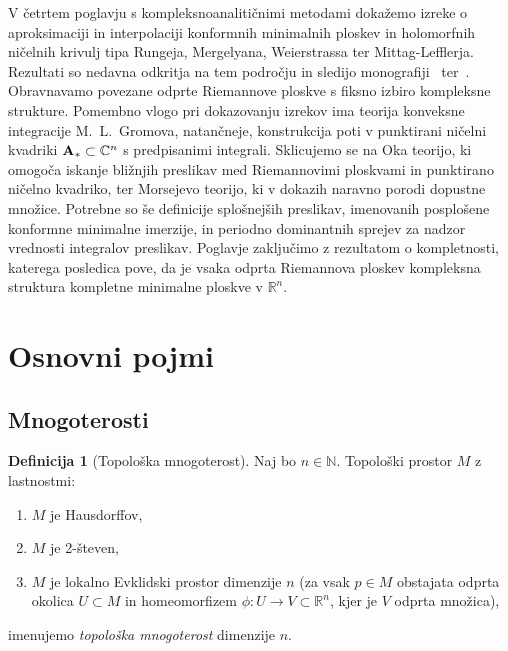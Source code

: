 \documentclass[12pt,a4paper,twoside]{article}
\theoremstyle{definition} %
\newtheorem{definicija}{Definicija}[section]
\theoremstyle{plain} %
\numberwithin{equation}{section}  %
\newcommand{\R}{\mathbb R}
\newcommand{\N}{\mathbb N}
\newcommand{\C}{\mathbb C}
\begin{document}
V četrtem poglavju s kompleksnoanalitičnimi metodami dokažemo izreke o aproksimaciji in interpolaciji konformnih minimalnih ploskev in holomorfnih ničelnih krivulj tipa Rungeja, Mergelyana, Weierstrassa ter Mittag-Lefflerja. Rezultati so nedavna odkritja na tem področju in sledijo monografiji~\cite{alarcon2021minimal} ter~\cite{alarcon2019new}.
Obravnavamo povezane odprte Riemannove ploskve s fiksno izbiro kompleksne strukture. Pomembno vlogo pri dokazovanju izrekov ima teorija konveksne integracije M.~L.~Gromova, natančneje, konstrukcija poti v punktirani ničelni kvadriki $\textup{\textbf{A}}_{*} \subset \C^{n}$ s predpisanimi integrali. Sklicujemo se na Oka teorijo, ki omogoča iskanje bližnjih preslikav med Riemannovimi ploskvami in punktirano ničelno kvadriko, ter Morsejevo teorijo, ki v dokazih naravno porodi dopustne množice. Potrebne so še definicije splošnejših preslikav, imenovanih posplošene konformne minimalne imerzije, in periodno dominantnih sprejev za nadzor vrednosti integralov preslikav. Poglavje zaključimo z rezultatom o kompletnosti, katerega posledica pove, da je vsaka odprta Riemannova ploskev kompleksna struktura kompletne minimalne ploskve v $\R^{n}$.

\section{Osnovni pojmi}

\subsection{Mnogoterosti}

\begin{definicija} [Topološka mnogoterost]
Naj bo $n \in \N$. Topološki prostor $M$ z lastnostmi:
\begin{enumerate}
\item $M$ je Hausdorffov,
\item $M$ je 2-števen,
\item $M$ je lokalno Evklidski prostor dimenzije $n$ (za vsak $p \in M$ obstajata odprta okolica $U \subset M$ in homeomorfizem $\phi \colon U \to V \subset \R^{n}$, kjer je $V$ odprta množica),
\end{enumerate}
imenujemo \emph{topološka mnogoterost} dimenzije $n$.
\end{definicija}
\end{document}
